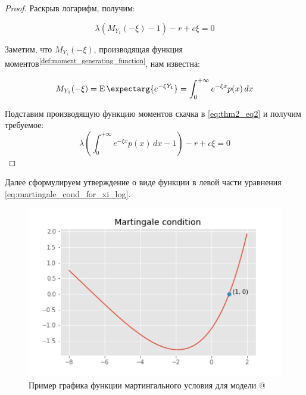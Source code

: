 \documentclass[a4paper,12pt]{article}
\makeatletter
\theoremstyle{definition}
\newcommand*{\rom}[1]{\expandafter\@slowromancap\romannumeral #1@}
\newcommand{\expect}{\operatorname{E}\expectarg}
\makeatother
\begin{document}
\begin{proof}
Раскрыв логарифм, получим:

\begin{equation}\label{eq:thm2_eq2}
\lambda \left(M_{Y_1}(- \xi) - 1\right) - r + c\xi = 0
\end{equation}

Заметим, что $M_{Y_1}(-\xi)$, производящая функция моментов\textsuperscript{{\ref{def:moment_generating_function}}}, нам известна:

\begin{equation*}
M_{Y_1}(-\xi) = \expect{e^{-\xi Y_1}} = \int_{0}^{+\infty} e^{-\xi x} p(x) \,dx
\end{equation*}

Подставим производящую функцию моментов скачка в \eqref{eq:thm2_eq2} и получим требуемое:
\begin{equation*}
\lambda \left(\int_{0}^{+\infty} e^{-\xi x} p(x) \,dx - 1\right) - r + c\xi = 0
\end{equation*}
\end{proof}

Далее сформулируем утверждение о виде функции в левой части уравнения \eqref{eq:martingale_cond_for_xi_log}.


\begin{figure}[htbp]
\label{fig:model1martingalecond}
\centerline{\includegraphics[scale=0.7]{img/model1_martingale_cond.png}}
\caption{Пример графика функции мартингального условия для модели \rom{1}}
\end{figure}
\end{document}
